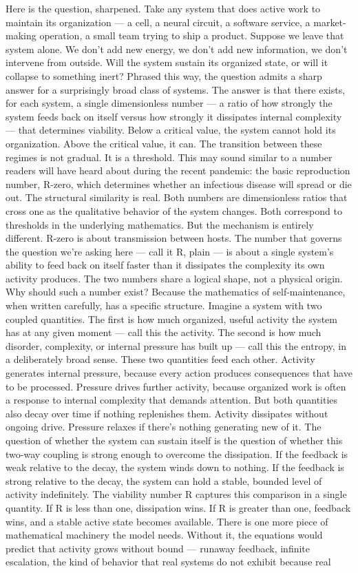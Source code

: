 \documentclass[12pt]{article}
\begin{document}
Here is the question, sharpened. Take any system that does active work to maintain its organization --- a cell, a neural circuit, a software service, a market-making operation, a small team trying to ship a product. Suppose we leave that system alone. We don't add new energy, we don't add new information, we don't intervene from outside. Will the system sustain its organized state, or will it collapse to something inert? Phrased this way, the question admits a sharp answer for a surprisingly broad class of systems. The answer is that there exists, for each system, a single dimensionless number --- a ratio of how strongly the system feeds back on itself versus how strongly it dissipates internal complexity --- that determines viability. Below a critical value, the system cannot hold its organization. Above the critical value, it can. The transition between these regimes is not gradual. It is a threshold. This may sound similar to a number readers will have heard about during the recent pandemic: the basic reproduction number, R-zero, which determines whether an infectious disease will spread or die out. The structural similarity is real. Both numbers are dimensionless ratios that cross one as the qualitative behavior of the system changes. Both correspond to thresholds in the underlying mathematics. But the mechanism is entirely different. R-zero is about transmission between hosts. The number that governs the question we're asking here --- call it R, plain --- is about a single system's ability to feed back on itself faster than it dissipates the complexity its own activity produces. The two numbers share a logical shape, not a physical origin. Why should such a number exist? Because the mathematics of self-maintenance, when written carefully, has a specific structure. Imagine a system with two coupled quantities. The first is how much organized, useful activity the system has at any given moment --- call this the activity. The second is how much disorder, complexity, or internal pressure has built up --- call this the entropy, in a deliberately broad sense. These two quantities feed each other. Activity generates internal pressure, because every action produces consequences that have to be processed. Pressure drives further activity, because organized work is often a response to internal complexity that demands attention. But both quantities also decay over time if nothing replenishes them. Activity dissipates without ongoing drive. Pressure relaxes if there's nothing generating new of it. The question of whether the system can sustain itself is the question of whether this two-way coupling is strong enough to overcome the dissipation. If the feedback is weak relative to the decay, the system winds down to nothing. If the feedback is strong relative to the decay, the system can hold a stable, bounded level of activity indefinitely. The viability number R captures this comparison in a single quantity. If R is less than one, dissipation wins. If R is greater than one, feedback wins, and a stable active state becomes available. There is one more piece of mathematical machinery the model needs. Without it, the equations would predict that activity grows without bound --- runaway feedback, infinite escalation, the kind of behavior that real systems do not exhibit because real 
\end{document}
